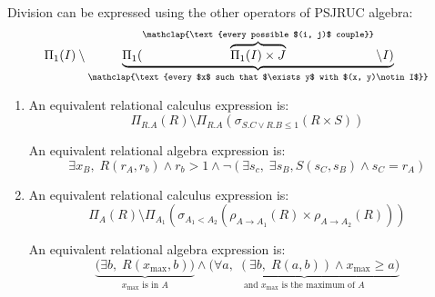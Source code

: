 \documentclass{../../cs-classes/cs-classes}
\begin{document}
\begin{exercise}
    Division can be expressed using the other operators of PSJRUC algebra:
    \begin{equation*}
        \Pi_1(I)\setminus \underbrace{\Pi_1(\overbrace{\Pi_1(I)\times J}^{\mathclap{\text{every possible $(i, j)$ couple}}} \setminus I)}_{\mathclap{\text{every $x$ such that $\exists y$ with $(x, y)\notin I$}}}
    \end{equation*}
\end{exercise}

\setcounter{exercise}{6}
\begin{exercise}
    \begin{enumerate}
        \item An equivalent relational calculus expression is:
        \begin{equation*}
            \Pi_{R.A}(R)\setminus\Pi_{R.A}(\sigma_{S.C\lor R.B\leq 1}(R\times S))
        \end{equation*}

        An equivalent relational algebra expression is:
        \begin{equation*}
            \exists x_B, \; R(r_A, r_b) \land r_b > 1 \land \lnot (\exists s_c, \; \exists s_B, S(s_C, s_B)\land s_C=r_A)
        \end{equation*}

        \item An equivalent relational calculus expression is:
        \begin{equation*}
            \Pi_A(R)\setminus \Pi_{A_1}(\sigma_{A_1<A_2}(\rho_{A\to A_1}(R)\times \rho_{A\to A_2}(R)))
        \end{equation*}

        An equivalent relational algebra expression is:
        \begin{equation*}
            \underbrace{\big(\exists b, \; R(x_{\max}, b)\big)}_{x_{\max} \text{ is in } A} \land \underbrace{\big(\forall a, \; (\exists b, \; R(a, b)) \land x_{\max} \geq a\big)}_{\text{and } x_{\max} \text{ is the maximum of } A}
        \end{equation*}
    \end{enumerate}
\end{exercise}
\end{document}
